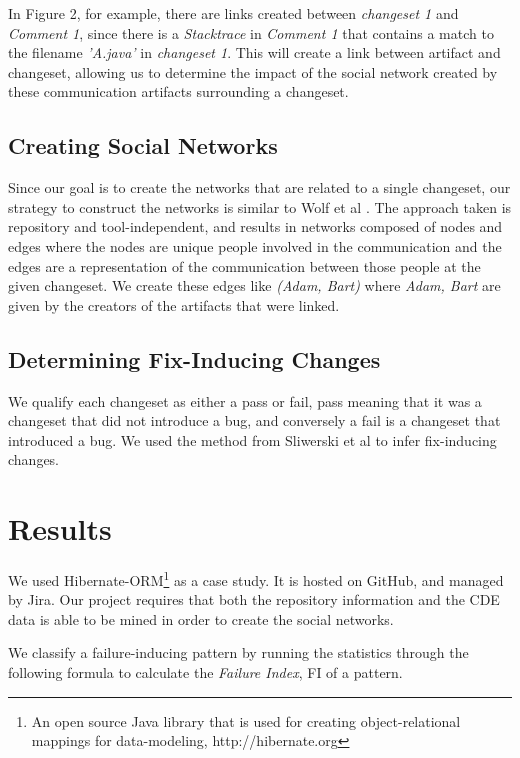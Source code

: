 \documentclass[conference]{IEEEtran}
\begin{document}
In Figure 2, for example, there are links created between \emph{changeset 1} and \emph{Comment 1}, since there is a \emph{Stacktrace} in \emph{Comment 1} that contains a match to the filename \emph{'A.java'} in \emph{changeset 1}.  This will create a link between artifact and changeset, allowing us to determine the impact of the social network created by these communication artifacts surrounding a changeset.

\subsection{Creating Social Networks} 
\label{sec:socialnetworks}
Since our goal is to create the networks that are related to a single changeset, our strategy to construct the networks is similar to Wolf et al \cite{4721184}.  The approach taken is repository and tool-independent, and results in networks composed of nodes and edges where the nodes are unique people involved in the communication and the edges are a representation of the communication between those people at the given changeset.  We create these edges like \emph{(Adam, Bart)} where \emph{Adam, Bart} are given by the creators of the artifacts that were linked.   

\subsection{Determining Fix-Inducing Changes}
We qualify each changeset as either a pass or fail, pass meaning that it was a changeset that did not introduce a bug, and conversely a fail is a changeset that introduced a bug.  We used the method from Sliwerski et al \cite{Sliwerski:2005:CIF:1083142.1083147} to infer fix-inducing changes. 

\section{Results}
We used Hibernate-ORM\footnote{An open source Java library that is used for creating object-relational mappings for data-modeling, http://hibernate.org} as a case study.  It is hosted on GitHub, and managed by Jira\footnotemark[2].  Our project requires that both the repository information and the CDE data is able to be mined in order to create the social networks.

We classify a failure-inducing pattern by running the statistics through the following formula to calculate the \emph{Failure Index}, FI of a pattern.
\end{document}
